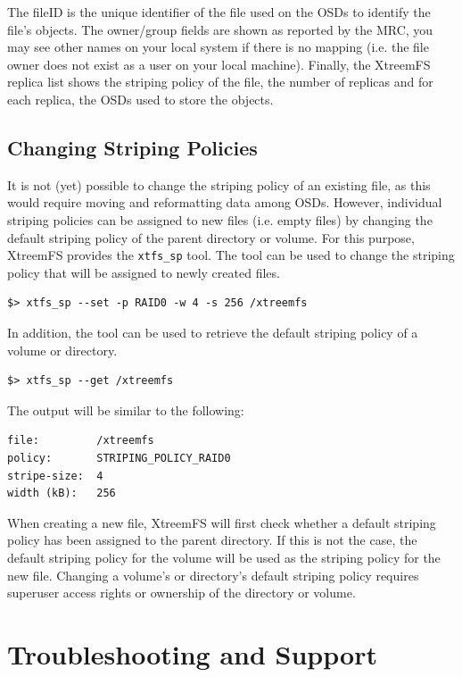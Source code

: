 \documentclass[a4paper,10pt]{book}
\begin{document}
The fileID  is the unique identifier of the file used on the OSDs to identify the file's objects. The owner/group fields are shown as reported by the MRC, you may see other names on your local system if there is no mapping (i.e. the file owner does not exist as a user on your local machine).
Finally, the XtreemFS replica list shows the striping policy of the file, the number of replicas and for each replica, the OSDs used to store the objects.


\section{Changing Striping Policies}

It is not (yet) possible to change the striping policy of an existing file, as this would require moving and reformatting data among OSDs. However, individual striping policies can be assigned to new files (i.e. empty files) by changing the default striping policy of the parent directory or volume. For this purpose, XtreemFS provides the \texttt{xtfs\_sp} tool. The tool can be used to change the striping policy that will be assigned to newly created files.

\begin{verbatim}
$> xtfs_sp --set -p RAID0 -w 4 -s 256 /xtreemfs
\end{verbatim}

In addition, the tool can be used to retrieve the default striping policy of a volume or directory.

\begin{verbatim}
$> xtfs_sp --get /xtreemfs
\end{verbatim}

The output will be similar to the following:

\begin{verbatim}
file:         /xtreemfs
policy:       STRIPING_POLICY_RAID0
stripe-size:  4
width (kB):   256
\end{verbatim}

When creating a new file, XtreemFS will first check whether a default striping policy has been assigned to the parent directory. If this is not the case, the default striping policy for the volume will be used as the striping policy for the new file. Changing a volume's or directory's default striping policy requires superuser access rights or ownership of the directory or volume.

\chapter{Troubleshooting and Support}
\end{document}
